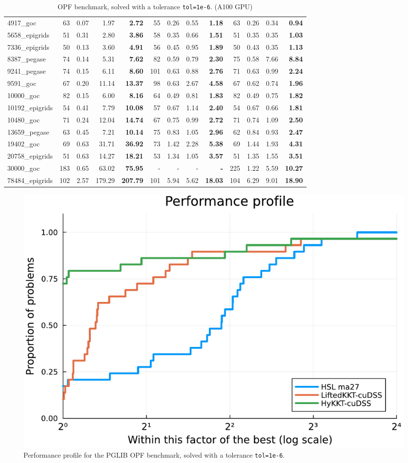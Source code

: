 \begin{table}[!ht]
{\begin{tabular}{|l|rrr >{\bfseries}r|rrr >{\bfseries}r|rrr >{\bfseries}r|}
      \hline
      4917\_goc & 63 & 0.07 & 1.97 & 2.72 & 55 & 0.26 & 0.55 & 1.18 & 63 & 0.26 & 0.34 & 0.94 \\
      5658\_epigrids & 51 & 0.31 & 2.80 & 3.86 & 58 & 0.35 & 0.66 & 1.51 & 51 & 0.35 & 0.35 & 1.03 \\
      7336\_epigrids & 50 & 0.13 & 3.60 & 4.91 & 56 & 0.45 & 0.95 & 1.89 & 50 & 0.43 & 0.35 & 1.13 \\
      8387\_pegase & 74 & 0.14 & 5.31 & 7.62 & 82 & 0.59 & 0.79 & 2.30 & 75 & 0.58 & 7.66 & 8.84 \\
      9241\_pegase & 74 & 0.15 & 6.11 & 8.60 & 101 & 0.63 & 0.88 & 2.76 & 71 & 0.63 & 0.99 & 2.24 \\
      \hline
      9591\_goc & 67 & 0.20 & 11.14 & 13.37 & 98 & 0.63 & 2.67 & 4.58 & 67 & 0.62 & 0.74 & 1.96 \\
      10000\_goc & 82 & 0.15 & 6.00 & 8.16 & 64 & 0.49 & 0.81 & 1.83 & 82 & 0.49 & 0.75 & 1.82 \\
      10192\_epigrids & 54 & 0.41 & 7.79 & 10.08 & 57 & 0.67 & 1.14 & 2.40 & 54 & 0.67 & 0.66 & 1.81 \\
      10480\_goc & 71 & 0.24 & 12.04 & 14.74 & 67 & 0.75 & 0.99 & 2.72 & 71 & 0.74 & 1.09 & 2.50 \\
      13659\_pegase & 63 & 0.45 & 7.21 & 10.14 & 75 & 0.83 & 1.05 & 2.96 & 62 & 0.84 & 0.93 & 2.47 \\
      \hline
      19402\_goc & 69 & 0.63 & 31.71 & 36.92 & 73 & 1.42 & 2.28 & 5.38 & 69 & 1.44 & 1.93 & 4.31 \\
      20758\_epigrids & 51 & 0.63 & 14.27 & 18.21 & 53 & 1.34 & 1.05 & 3.57 & 51 & 1.35 & 1.55 & 3.51 \\
      30000\_goc & 183 & 0.65 & 63.02 & 75.95 & - & - & - & - & 225 & 1.22 & 5.59 & 10.27 \\
      78484\_epigrids & 102 & 2.57 & 179.29 & 207.79 & 101 & 5.94 & 5.62 & 18.03 & 104 & 6.29 & 9.01 & 18.90 \\
      \hline
    \end{tabular}
  }
  \caption{OPF benchmark, solved with a tolerance {\tt tol=1e-6}. (A100 GPU) \label{tab:opf:benchmark}}
\end{table}

\begin{figure}[!ht]
  \centering
  \includegraphics[width=.6\textwidth]{figures/pprof-cuda.pdf}
  \caption{Performance profile for the PGLIB OPF benchmark, solved
    with a tolerance {\tt tol=1e-6}.
  \label{fig:opf:pprof}}
\end{figure}

